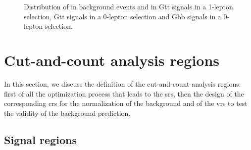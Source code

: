 \begin{figure}[htbp]
\centering 
{}
\caption{Distribution of \met in  background events and in  Gtt signals in a 1-lepton selection, 
 Gtt signals in a  0-lepton selection
 and  Gbb signals in a  0-lepton selection.
}\label{fig:strong:sig:met}
\end{figure}

\FloatBarrier

\section{Cut-and-count analysis regions}
\label{sec:strong:cutandcount}
In this section, we discuss the definition of the cut-and-count analysis regions: 
first of all the optimization process that leads to the \glspl{sr}, then the 
design of the corresponding \glspl{cr} for the normalization of the \ttbar background  
and of the \glspl{vr} to test the validity of the background prediction.

\subsection{Signal regions}

